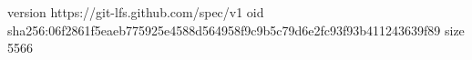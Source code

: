 version https://git-lfs.github.com/spec/v1
oid sha256:06f2861f5eaeb775925e4588d564958f9c9b5c79d6e2fc93f93b411243639f89
size 5566
